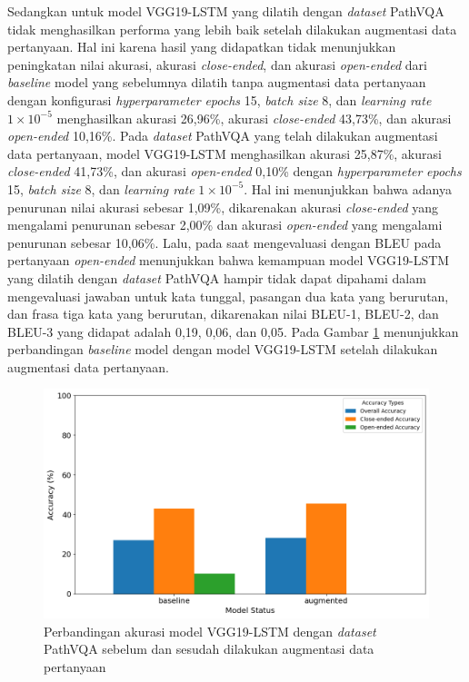 \par Sedangkan untuk model VGG19-LSTM yang dilatih dengan \textit{dataset} PathVQA tidak menghasilkan performa yang lebih baik setelah dilakukan augmentasi data pertanyaan. Hal ini karena hasil yang didapatkan tidak menunjukkan peningkatan nilai akurasi, akurasi \textit{close-ended}, dan akurasi \textit{open-ended} dari \textit{baseline} model yang sebelumnya dilatih tanpa augmentasi data pertanyaan dengan konfigurasi \textit{hyperparameter} \textit{epochs} 15, \textit{batch size} 8, dan \textit{learning rate} $1 \times 10^{-5}$ menghasilkan akurasi 26,96\%, akurasi \textit{close-ended} 43,73\%, dan akurasi \textit{open-ended} 10,16\%. Pada \textit{dataset} PathVQA yang telah dilakukan augmentasi data pertanyaan, model VGG19-LSTM menghasilkan akurasi 25,87\%, akurasi \textit{close-ended} 41,73\%, dan akurasi \textit{open-ended} 0,10\% dengan \textit{hyperparameter} \textit{epochs} 15, \textit{batch size} 8, dan \textit{learning rate} $1 \times 10^{-5}$. Hal ini menunjukkan bahwa adanya penurunan nilai akurasi sebesar 1,09\%, dikarenakan akurasi \textit{close-ended} yang mengalami penurunan sebesar 2,00\% dan akurasi \textit{open-ended} yang mengalami penurunan sebesar 10,06\%. Lalu, pada saat mengevaluasi dengan BLEU pada pertanyaan \textit{open-ended} menunjukkan bahwa kemampuan model VGG19-LSTM yang dilatih dengan \textit{dataset} PathVQA hampir tidak dapat dipahami dalam mengevaluasi jawaban untuk kata tunggal, pasangan dua kata yang berurutan, dan frasa tiga kata yang berurutan, dikarenakan nilai BLEU-1, BLEU-2, dan BLEU-3 yang didapat adalah 0,19, 0,06, dan 0,05. Pada Gambar \ref{fig:perbandingan-akurasi-vgg19-lstm-pathvqa} menunjukkan perbandingan \textit{baseline} model dengan model VGG19-LSTM setelah dilakukan augmentasi data pertanyaan.

\begin{figure}[H]
  \centering
  \includegraphics[width=\textwidth]{image/bab4/vgg19-lstm-pathvqa.png}
  \caption{Perbandingan akurasi model VGG19-LSTM dengan \textit{dataset} PathVQA sebelum dan sesudah dilakukan augmentasi data pertanyaan}
  \label{fig:perbandingan-akurasi-vgg19-lstm-pathvqa}
\end{figure}


